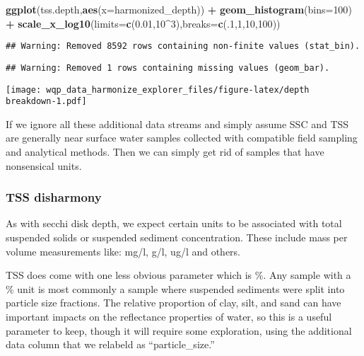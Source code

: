 \documentclass[]{article}
\newenvironment{Shaded}{\begin{snugshade}}{\end{snugshade}}
\newcommand{\DataTypeTok}[1]{\textcolor[rgb]{0.13,0.29,0.53}{#1}}
\newcommand{\DecValTok}[1]{\textcolor[rgb]{0.00,0.00,0.81}{#1}}
\newcommand{\FloatTok}[1]{\textcolor[rgb]{0.00,0.00,0.81}{#1}}
\newcommand{\KeywordTok}[1]{\textcolor[rgb]{0.13,0.29,0.53}{\textbf{#1}}}
\newcommand{\NormalTok}[1]{#1}
\newcommand{\OperatorTok}[1]{\textcolor[rgb]{0.81,0.36,0.00}{\textbf{#1}}}
\newcommand{\StringTok}[1]{\textcolor[rgb]{0.31,0.60,0.02}{#1}}
\begin{document}
\begin{Shaded}
\begin{Highlighting}[]
\KeywordTok{ggplot}\NormalTok{(tss.depth,}\KeywordTok{aes}\NormalTok{(}\DataTypeTok{x=}\NormalTok{harmonized_depth)) }\OperatorTok{+}\StringTok{ }
\StringTok{  }\KeywordTok{geom_histogram}\NormalTok{(}\DataTypeTok{bins=}\DecValTok{100}\NormalTok{) }\OperatorTok{+}\StringTok{ }
\StringTok{  }\KeywordTok{scale_x_log10}\NormalTok{(}\DataTypeTok{limits=}\KeywordTok{c}\NormalTok{(}\FloatTok{0.01}\NormalTok{,}\DecValTok{10}\OperatorTok{^}\DecValTok{3}\NormalTok{),}\DataTypeTok{breaks=}\KeywordTok{c}\NormalTok{(.}\DecValTok{1}\NormalTok{,}\DecValTok{1}\NormalTok{,}\DecValTok{10}\NormalTok{,}\DecValTok{100}\NormalTok{)) }
\end{Highlighting}
\end{Shaded}

\begin{verbatim}
## Warning: Removed 8592 rows containing non-finite values (stat_bin).
\end{verbatim}

\begin{verbatim}
## Warning: Removed 1 rows containing missing values (geom_bar).
\end{verbatim}

\texttt{[image: wqp\_data\_harmonize\_explorer\_files/figure-latex/depth breakdown-1.pdf]}

If we ignore all these additional data streams and simply assume SSC and
TSS are generally near surface water samples collected with compatible
field sampling and analytical methods. Then we can simply get rid of
samples that have nonsensical units.

\hypertarget{tss-disharmony}{%
\subsubsection{TSS disharmony}\label{tss-disharmony}}

As with secchi disk depth, we expect certain units to be associated with
total suspended solids or suspended sediment concentration. These
include mass per volume measurements like: mg/l, g/l, ug/l and others.

TSS does come with one less obvious parameter which is \%. Any sample
with a \% unit is most commonly a sample where suspended sediments were
split into particle size fractions. The relative proportion of clay,
silt, and sand can have important impacts on the reflectance properties
of water, so this is a useful parameter to keep, though it will require
some exploration, using the additional data column that we relabeld as
``particle\_size.''
\end{document}
